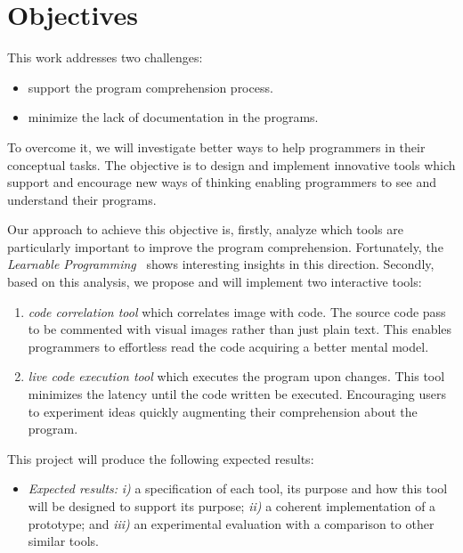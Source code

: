 
% 
% 

\section{Objectives}

This work addresses two challenges:

\begin{itemize}
\item support the program comprehension process.
\item minimize the lack of documentation in the programs.
\end{itemize}

To overcome it, we will investigate better ways to help programmers in their conceptual tasks. The objective is to design and implement innovative tools which support and encourage new ways of thinking enabling programmers to see and understand their programs.

Our approach to achieve this objective is, firstly, analyze which tools are particularly important to improve the program comprehension. Fortunately, the \textit{Learnable Programming}~\cite{learnableProg,inventingPrin} shows interesting insights in this direction. Secondly, based on this analysis, we propose and will implement two interactive tools: 

\begin{enumerate}
\item \textit{code correlation tool} which correlates image with code. The source code pass to be commented with visual images rather than just plain text. This enables programmers to effortless read the code acquiring a better mental model.
\item \textit{live code execution tool} which executes the program upon changes. This tool minimizes the latency until the code written be executed. Encouraging users to experiment ideas quickly augmenting their comprehension about the program.
\end{enumerate}

This project will produce the following expected results:
 
\begin{itemize}
\item[] \textit{Expected results:} \textit{i)} a specification of each tool, its purpose and how this tool will be designed to support its purpose; \textit{ii)} a coherent implementation of a prototype; and \textit{iii)} an experimental evaluation with a comparison to other similar tools.
\end{itemize}
